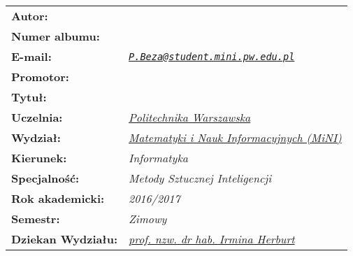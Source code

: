 \thispagestyle{empty}

\makeatletter
{
	\renewcommand{\arraystretch}{3.0}
	\vspace*{\fill}
	\begin{table}[h]
	\centering
	\begin{tabular}{>{\bfseries}l>{\itshape}l}
		Autor:            & \href{mailto:P.Beza@student.mini.pw.edu.pl}{\@author}\\
		Numer albumu:     & \@album\\
		E-mail:           & \texttt{\href{mailto:P.Beza@student.mini.pw.edu.pl}{P.Beza@student.mini.pw.edu.pl}}\\
		Promotor:         & \@supervisor\\
		Tytuł:            & \parbox{6.5cm}{\@title}\\
		Uczelnia:         & \href{https://www.pw.edu.pl/}{Politechnika Warszawska}\\
		Wydział:          & \href{http://www.mini.pw.edu.pl/}{Matematyki i Nauk Informacyjnych (MiNI)}\\
		Kierunek:         & Informatyka\\
		Specjalność:      & Metody Sztucznej Inteligencji\\
		Rok akademicki:   & 2016/2017\\
		Semestr:          & Zimowy\\
		Dziekan Wydziału: & \href{mailto:I.Herburt@mini.pw.edu.pl}{prof. nzw. dr hab. Irmina Herburt}\\
	\end{tabular}
	\end{table}
	\vspace*{\fill}
}
\makeatother
